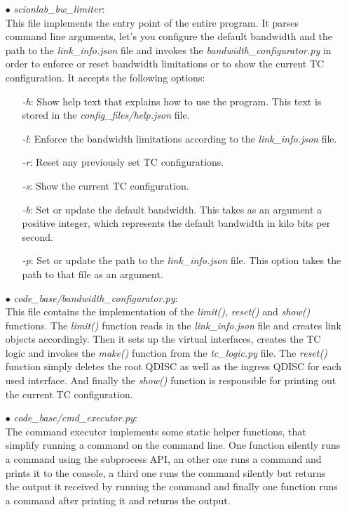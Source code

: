 \begin{enumerate}
\item[$\bullet$]\textit{scionlab\_bw\_limiter}:
\\
This file implements the entry point of the entire program. It parses command line arguments, let's you configure the default bandwidth and the path to the \textit{link\_info.json} file and invokes the \linebreak \textit{bandwidth\_configurator.py} in order to enforce or reset bandwidth limitations or to show the current \acs{TC} configuration. It accepts the following options:
	\begin{enumerate}
	\item[\textit{-h}:] Show help text that explains how to use the program. This text is stored in the \textit{config\_files/help.json} file.
	\item[\textit{-l}:] Enforce the bandwidth limitations according to the \textit{link\_info.json} file.
	\item[\textit{-r}:] Reset any previously set \acs{TC} configurations.
	\item[\textit{-s}:] Show the current \acs{TC} configuration.
	\item[\textit{-b}:] Set or update the default bandwidth. This takes as an argument a positive integer, which represents the default bandwidth in kilo bits per second.
	\item[\textit{-p}:] Set or update the path to the \textit{link\_info.json} file. This option takes the path to that file as an argument.
	\end{enumerate}

\item[$\bullet$]\textit{code\_base/bandwidth\_configurator.py}:
\\
This file contains the implementation of the \textit{limit()}, \textit{reset()} and \textit{show()} functions. The \textit{limit()} function reads in the \textit{link\_info.json} file and creates link objects accordingly. Then it sets up the virtual interfaces, creates the \acs{TC} logic and invokes the \textit{make()} function from the \textit{tc\_logic.py} file. The \textit{reset()} function simply deletes the root \acs{QDISC} as well as the ingress \acs{QDISC} for each used interface. And finally the \textit{show()} function is responsible for printing out the current \acs{TC} configuration.

\item[$\bullet$]\textit{code\_base/cmd\_executor.py}:
\\
The command executor implements some static helper functions, that simplify running a command on the command line. One function silently runs a command using the subprocess \acs{API}, an other one runs a command and prints it to the console, a third one runs the command silently but returns the output it received by running the command and finally one function runs a command after printing it and returns the output.


\end{enumerate}
